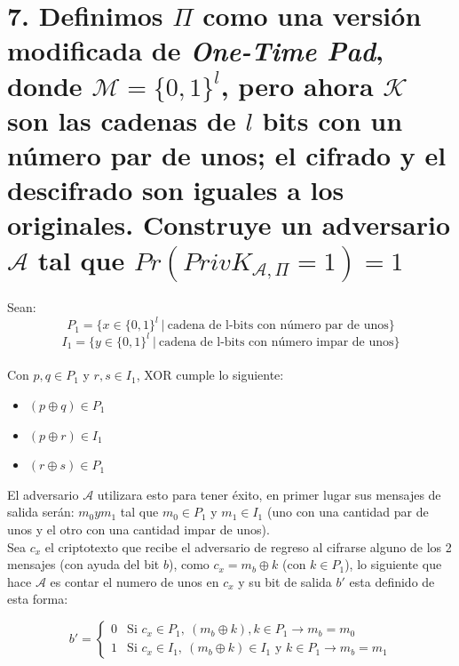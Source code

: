 \documentclass[11pt]{article}
\begin{document}
        \section*{7. Definimos $ \Pi $ como una versión modificada de \textit{One-Time Pad}, donde $ \mathcal{M} = \{0, 1\}^{l}$, pero ahora $ \mathcal{K} $ son las cadenas de $ l $ bits con un número par de unos; el cifrado y el descifrado son iguales a los originales. Construye un adversario $ \mathcal{A} $ tal que $ Pr(PrivK_{\mathcal{A}, \Pi} = 1) = 1 $ }
        
        Sean:
        $$ P_{1} = \{x \in \{0, 1\}^{l}\ |\ \text{cadena de l-bits con número par de unos}\} $$
        $$ I_{1} = \{y \in \{0, 1\}^{l}\ |\ \text{cadena de l-bits con número impar de unos}\} $$\\
        Con $ p,q \in P_{1} $ y $ r,s \in I_{1} $, XOR cumple lo siguiente:
        
        \begin{itemize}
            \item $ (p \oplus q) \in P_{1} $
            \item $ (p \oplus r) \in I_{1} $
            \item $ (r \oplus s) \in P_{1} $
        \end{itemize}
        
        El adversario $ \mathcal{A} $ utilizara esto para tener éxito, en primer lugar sus mensajes de salida serán: $ m_{0} y m_{1} $ tal que $ m_{0} \in P_{1} $ y $ m_{1} \in I_{1} $ (uno con una cantidad par de unos y el otro con una cantidad impar de unos).\\
        
        Sea $ c_{x} $ el criptotexto que recibe el adversario de regreso al cifrarse alguno de los 2 mensajes (con ayuda del bit $ b $), como $ c_{x} = m_{b} \oplus k $ (con $ k \in P_{1} $), lo siguiente que hace $ \mathcal{A} $ es contar el numero de unos en $ c_{x} $ y su bit de salida $  b' $ esta definido de esta forma:
        
        \begin{equation*}
        b' =
            \begin{cases}
            0    & \text{Si } c_{x} \in P_{1},\ (m_{b} \oplus k), k \in P_{1} \rightarrow m_{b} = m_{0}\\
            1    & \text{Si } c_{x} \in I_{1},\ (m_{b} \oplus k) \in I_{1} \text{ y } k \in P_{1} \rightarrow m_{b} = m_{1}
            \end{cases}
        \end{equation*}
        
\end{document}

